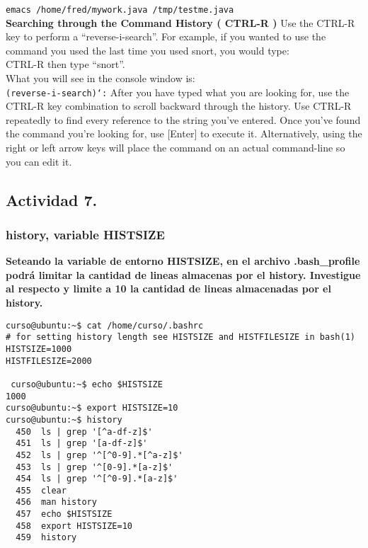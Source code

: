 \documentclass[a4paper,11pt,spanish]{article} %
\newenvironment{myscriptlisting}
{\begin{list}{}{\setlength{\leftmargin}{1em}}\item\scriptsize\bfseries}
{\end{list}}
\begin{document}
\texttt{emacs /home/fred/mywork.java /tmp/testme.java}\\

\textbf{Searching through the Command History ( CTRL-R )}
Use the CTRL-R key to perform a “reverse-i-search”. 
For example, if you wanted to use the command you used the last time you used snort, you would type:\\

CTRL-R then type “snort”.\\

What you will see in the console window is:\\

\texttt{(reverse-i-search)`:}
After you have typed what you are looking for, use the CTRL-R key combination to scroll backward
through the history.
Use CTRL-R repeatedly to find every reference to the string you've entered. 
Once you've found the command you're looking for, use [Enter] to execute it.
Alternatively, using the right or left arrow keys will place the command on an actual command-line
so you can edit it.

\cite{tldphist}

\subsection{Actividad 7.}

\subsubsection{history, variable HISTSIZE}

\textbf{Seteando la variable de entorno HISTSIZE, en el archivo .bash\_profile podrá limitar
la cantidad de lineas almacenas por el history. Investigue al respecto y limite a 10 la
cantidad de lineas almacenadas por el history.}


\begin{myscriptlisting}
 \begin{verbatim}
curso@ubuntu:~$ cat /home/curso/.bashrc 
# for setting history length see HISTSIZE and HISTFILESIZE in bash(1)
HISTSIZE=1000
HISTFILESIZE=2000

 curso@ubuntu:~$ echo $HISTSIZE
1000
curso@ubuntu:~$ export HISTSIZE=10
curso@ubuntu:~$ history
  450  ls | grep '[^a-df-z]$'
  451  ls | grep '[a-df-z]$'
  452  ls | grep '^[^0-9].*[^a-z]$'
  453  ls | grep '^[0-9].*[a-z]$'
  454  ls | grep '^[^0-9].*[a-z]$'
  455  clear
  456  man history
  457  echo $HISTSIZE
  458  export HISTSIZE=10
  459  history
\end{verbatim}
\end{myscriptlisting}
\end{document}
